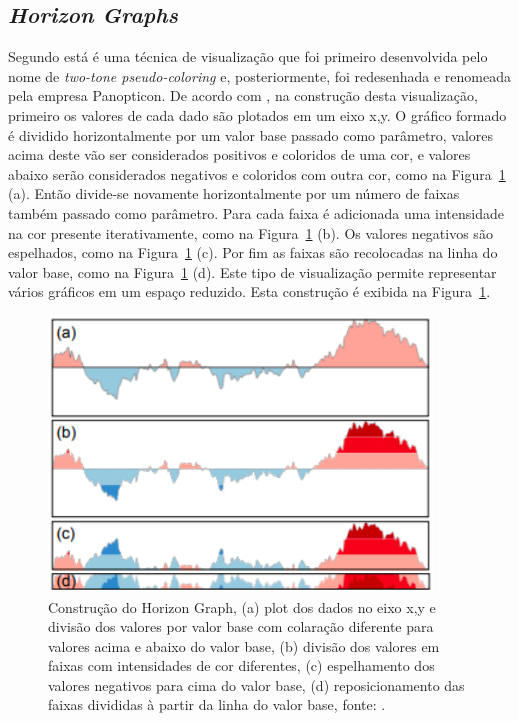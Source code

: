 \documentclass[article,11pt,oneside,a4paper]{abntex2} %
\begin{document}
	\subsection{\textit{Horizon Graphs}}
		\hspace{13pt} 
	Segundo  está é uma técnica de visualização que foi primeiro desenvolvida pelo nome de \textit{two-tone pseudo-coloring} \cite{saito2005two} e, posteriormente, foi redesenhada e renomeada pela empresa Panopticon. De acordo com , na construção desta visualização, primeiro os valores de cada dado são plotados em um eixo x,y. O gráfico formado é dividido horizontalmente por um valor base passado como parâmetro, valores acima deste vão ser considerados positivos e coloridos de uma cor, e valores abaixo serão considerados negativos e coloridos com outra cor, como na Figura~\ref{horizon_graph} (a). Então divide-se novamente horizontalmente por um número de faixas também passado como parâmetro. Para cada faixa é adicionada uma intensidade na cor presente iterativamente, como na Figura~\ref{horizon_graph} (b). Os valores negativos são espelhados, como na Figura~\ref{horizon_graph} (c). Por fim as faixas são recolocadas na linha do valor base, como na Figura~\ref{horizon_graph} (d). Este tipo de visualização permite representar vários gráficos em um espaço reduzido. Esta construção é exibida na Figura~\ref{horizon_graph}.
	
	\begin{figure}[h!]
	{\centering
		\includegraphics[width=\linewidth/2]{figuras/horizon_graph.png}
		\caption{ Construção do Horizon Graph, (a) plot dos dados no eixo x,y e divisão dos valores por valor base com colaração diferente para valores acima e abaixo do valor base, (b) divisão dos valores em faixas com intensidades de cor diferentes, (c) espelhamento dos valores negativos para cima do valor base, (d) reposicionamento das faixas divididas à partir da linha do valor base, fonte: \cite{perin2013interactive}.}
		\label{horizon_graph}
	}
	\end{figure}	
	
\end{document}
